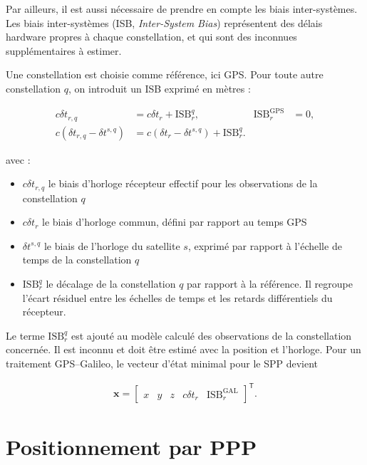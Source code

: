 Par ailleurs, il est aussi nécessaire de prendre en compte les biais inter-systèmes.
Les biais inter-systèmes (ISB, \textit{Inter-System Bias}) représentent des délais hardware propres à chaque constellation, et qui sont des inconnues
supplémentaires à estimer.

Une constellation est choisie comme référence, ici GPS. Pour toute autre
constellation $q$, on introduit un ISB exprimé en mètres :

\begin{align}
c\delta t_{r,q}
&=
c\delta t_r+\mathrm{ISB}_{r}^{q},
&
\mathrm{ISB}_{r}^{\mathrm{GPS}}
&=0,
\\
c\left(\delta t_{r,q}-\delta t^{s,q}\right)
&=
c\left(\delta t_r-\delta t^{s,q}\right)
+\mathrm{ISB}_{r}^{q}.
\label{eq:isb_definition}
\end{align}

avec :

\begin{itemize}
    \item $c\delta t_{r,q}$ le biais d'horloge récepteur effectif pour les
    observations de la constellation $q$ 
    \item $c\delta t_r$ le biais d'horloge commun, défini par rapport au temps
    GPS 
    \item $\delta t^{s,q}$ le biais de l'horloge du satellite $s$, exprimé par
    rapport à l'échelle de temps de la constellation $q$ 
    \item $\mathrm{ISB}_{r}^{q}$ le décalage de la constellation $q$ par
    rapport à la référence. Il regroupe l'écart résiduel entre les échelles de
    temps et les retards différentiels du récepteur.
\end{itemize}

Le terme $\mathrm{ISB}_{r}^{q}$ est ajouté au modèle calculé des observations
de la constellation concernée. Il est inconnu et doit être estimé avec la
position et l'horloge. Pour un traitement GPS--Galileo, le vecteur d'état
minimal pour le SPP devient

\begin{align}
\mathbf x
=
\begin{bmatrix}
x & y & z &
c\delta t_r &
\mathrm{ISB}_{r}^{\mathrm{GAL}}
\end{bmatrix}^{\mathsf T}.
\label{eq:multiconstellation_state}
\end{align}

\section{Positionnement par PPP}

